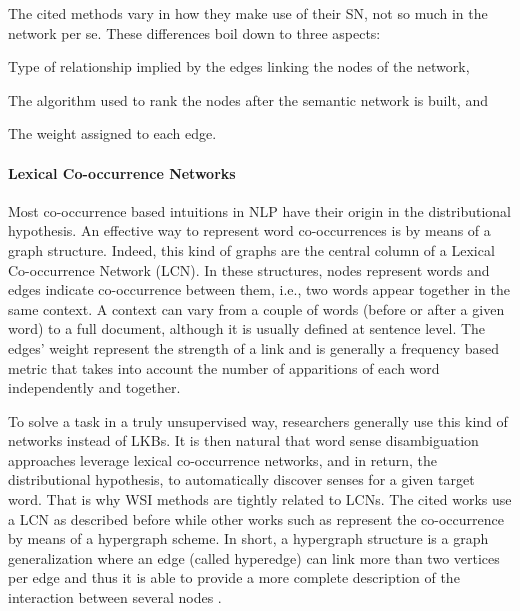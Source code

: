 The cited methods vary in how they make use of their SN, not so much in the network per se. These differences boil down to three aspects:
\begin{bulletList}
\item Type of relationship implied by the edges linking the nodes of the network, 
\item The algorithm used to rank the nodes after the semantic network is built, and
\item The weight assigned to each edge.
\end{bulletList}


\paragraph{Lexical Co-occurrence Networks}
Most co-occurrence based intuitions in NLP have their origin in the distributional hypothesis. An effective way to  represent word co-occurrences is by means of a graph structure. Indeed, this kind of graphs are the central column of a Lexical Co-occurrence Network (LCN). In these structures, nodes represent words and edges indicate co-occurrence between them, i.e., two words appear together in the same context. A context can vary from a couple of words (before or after a given word) to a full document, although it is usually defined at sentence level. The edges' weight  represent the strength of a link and is generally a frequency based metric that takes into account the  number of apparitions of each word independently and together.

To solve a task in a truly unsupervised way, researchers generally use this kind of networks instead of LKBs. It is then natural that word sense disambiguation approaches leverage lexical co-occurrence networks, and in return, the distributional hypothesis, to automatically discover senses for a given target word. That is why WSI methods \cite{2004.Veronis,2007.Klapaftis.UOY,2010.Navigli.InducingWordSenses.Triangles,2008.Klapaftis.WSIUsingCollocations,2011.DiMarco.Navigli.ClusteringWebSearch,2011.Jurgens.WSICommunityDetection} are tightly related to LCNs. 
The cited works use a LCN as described before while other works such as \cite{2007.Navigli.GraphConnectivity,2014.Tao.Qian.LexicalChainHypergraphWSI} represent the co-occurrence by means of a hypergraph scheme. In short, a hypergraph structure is a graph generalization where an edge (called hyperedge) can link more than two vertices per edge and thus it is able to provide a more complete description of the interaction between several nodes \cite{estrada2005}.

